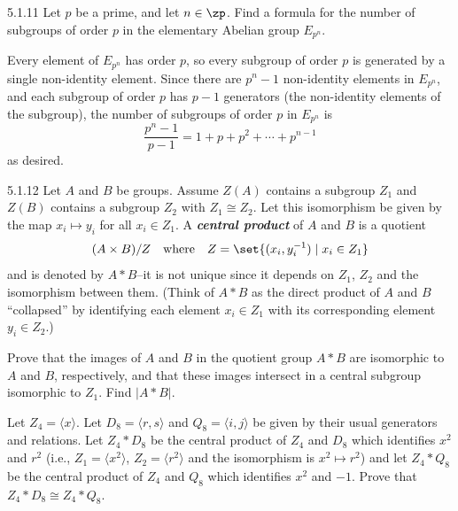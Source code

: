 \begin{exercise}{5.1.11}
    Let $p$ be a prime, and let $n \in \zp$.
	Find a formula for the number of subgroups of order $p$ in the elementary Abelian group $E_{p^n}$.
\end{exercise}

\begin{sol}
    Every element of $E_{p^n}$ has order $p$, so every subgroup of order $p$ is generated by a single non-identity element.
	Since there are $p^n - 1$ non-identity elements in $E_{p^n}$, and each subgroup of order $p$ has $p - 1$ generators (the non-identity elements of the subgroup), the number of subgroups of order $p$ in $E_{p^n}$ is
    \[
    	\frac{p^n - 1}{p - 1} = 1 + p + p^2 + \cdots + p^{n-1}
    \]
    as desired.
\end{sol}

\begin{spex}{5.1.12}
    Let $A$ and $B$ be groups.
	Assume $Z(A)$ contains a subgroup $Z_1$ and $Z(B)$ contains a subgroup $Z_2$ with $Z_1 \cong Z_2$.
	Let this isomorphism be given by the map $x_i \mapsto y_i$ for all $x_i \in Z_1$.
	A \textbf{\emph{central product}} of $A$ and $B$ is a quotient
    \[
    	(A \times B)/Z \quad \text{where} \quad Z = \set{(x_i, y_i^{-1}) \mid x_i \in Z_1}
    \]
    and is denoted by $A \ast B$--it is not unique since it depends on $Z_1$, $Z_2$ and the isomorphism between them. (Think of $A \ast B$ as the direct product of $A$ and $B$ ``collapsed'' by identifying each element $x_i \in Z_1$ with its corresponding element $y_i \in Z_2$.)
    \begin{subexercises}
        \item Prove that the images of $A$ and $B$ in the quotient group $A \ast B$ are isomorphic to $A$ and $B$, respectively, and that these images intersect in a central subgroup isomorphic to $Z_1$.
	    Find $|A \ast B|$.
        \item Let $Z_4 = \langle x \rangle$.
	    Let $D_8 = \langle r, s \rangle$ and $Q_8 = \langle i, j \rangle$ be given by their usual generators and relations.
	    Let $Z_4 \ast D_8$ be the central product of $Z_4$ and $D_8$ which identifies $x^2$ and $r^2$ (i.e., $Z_1 = \langle x^2 \rangle$, $Z_2 = \langle r^2 \rangle$ and the isomorphism is $x^2 \mapsto r^2$) and let $Z_4 \ast Q_8$ be the central product of $Z_4$ and $Q_8$ which identifies $x^2$ and $-1$.
	    Prove that $Z_4 \ast D_8 \cong Z_4 \ast Q_8$.
    \end{subexercises}
\end{spex}

